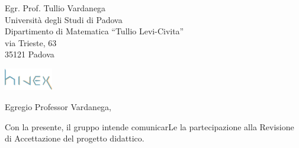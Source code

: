 \documentclass[a4paper]{letter} %
\date{Padova, \today}
\begin{document}
\begin{letter}{Egr. Prof. Tullio Vardanega\\
Università degli Studi di Padova\\
Dipartimento di Matematica “Tullio Levi-Civita”\\
via Trieste, 63\\
35121 Padova}

\includegraphics[width=80px]{../../util/hivex_logo3.png}

\opening{Egregio Professor Vardanega,}

Con la presente, il gruppo \hx{} intende comunicarLe la partecipazione alla Revisione di Accettazione del progetto didattico.


\end{letter}
\end{document}
